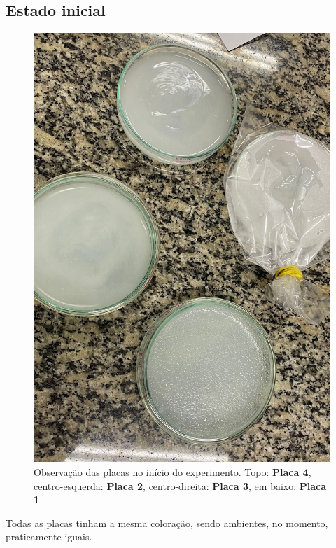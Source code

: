 \documentclass[12pt, titlepage]{article}
\begin{document}
\subsection{Estado inicial}
\begin{figure}[H]
	\centering
	\includegraphics[width=0.5\linewidth]{img/p1234_inicial.jpeg}
	\caption{Observação das placas no início do experimento. Topo: \textbf{Placa 4}, centro-esquerda: \textbf{Placa 2}, centro-direita: \textbf{Placa 3}, em baixo: \textbf{Placa 1}}
	\label{p1234_inicial}
\end{figure}

Todas as placas tinham a mesma coloração, sendo ambientes, no momento, praticamente iguais.
\end{document}
